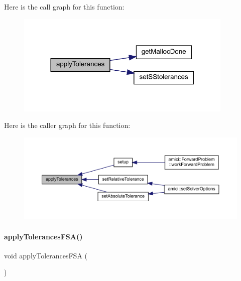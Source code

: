 Here is the call graph for this function\+:
\nopagebreak
\begin{figure}[H]
\begin{center}
\leavevmode
\includegraphics[width=293pt]{classamici_1_1_solver_a9819e5e5fa0d702721235eabd9e7c0e6_cgraph}
\end{center}
\end{figure}
Here is the caller graph for this function\+:
\nopagebreak
\begin{figure}[H]
\begin{center}
\leavevmode
\includegraphics[width=350pt]{classamici_1_1_solver_a9819e5e5fa0d702721235eabd9e7c0e6_icgraph}
\end{center}
\end{figure}
\mbox{\label{classamici_1_1_solver_a45ec22a0fddb6a8b37a3c3fdbdf7374f}} 
\paragraph{\texorpdfstring{apply\+Tolerances\+F\+S\+A()}{applyTolerancesFSA()}}
{\footnotesize\ttfamily void apply\+Tolerances\+F\+SA (\begin{DoxyParamCaption}{ }\end{DoxyParamCaption})\hspace{0.3cm}{\ttfamily [protected]}}

